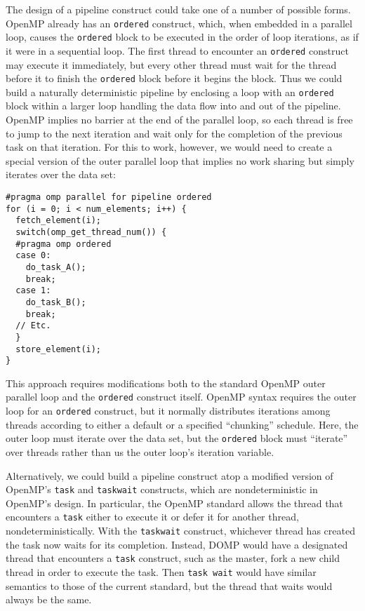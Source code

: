 The design of a pipeline construct could take one of a number of possible forms.  OpenMP already has an \texttt{ordered} construct, which, when embedded in a parallel loop, causes the \texttt{ordered} block to be executed in the order of loop iterations, as if it were in a sequential loop.  The first thread to encounter an \texttt{ordered} construct may execute it immediately, but every other thread must wait for the thread before it to finish the \texttt{ordered} block before it begins the block.  Thus we could build a naturally deterministic pipeline by enclosing a loop with an \texttt{ordered} block within a larger loop handling the data flow into and out of the pipeline.  OpenMP implies no barrier at the end of the parallel loop, so each thread is free to jump to the next iteration and wait only for the completion of the previous task on that iteration.  For this to work, however, we would need to create a special version of the outer parallel loop that implies no work sharing but simply iterates over the data set:
%
\begin{small}
\begin{verbatim}
#pragma omp parallel for pipeline ordered 
for (i = 0; i < num_elements; i++) {
  fetch_element(i);
  switch(omp_get_thread_num()) {
  #pragma omp ordered
  case 0:
    do_task_A();
    break;
  case 1:
    do_task_B();
    break;
  // Etc.
  }
  store_element(i);
}
\end{verbatim}
\end{small}
This approach requires modifications both to the standard OpenMP outer parallel loop and the \texttt{ordered} construct itself.  OpenMP syntax requires the outer loop for an \texttt{ordered} construct, but it normally distributes iterations among threads according to either a default or a specified ``chunking'' schedule.  Here, the outer loop must iterate over the data set, but the \texttt{ordered} block must ``iterate'' over threads rather than us the outer loop's iteration variable.


Alternatively, we could build a pipeline construct atop a modified version of OpenMP's \texttt{task} and \texttt{taskwait} constructs, which are nondeterministic in OpenMP's design.  In particular, the OpenMP standard allows the thread that encounters a \texttt{task} either to execute it or defer it for another thread, nondeterministically.  With the \texttt{taskwait} construct, whichever thread has created the task now waits for its completion.  Instead, DOMP would have a designated thread that encounters a \texttt{task} construct, such as the master, fork a new child thread in order to execute the task.  Then \texttt{task wait} would have similar semantics to those of the current standard, but the thread that waits would always be the same.

